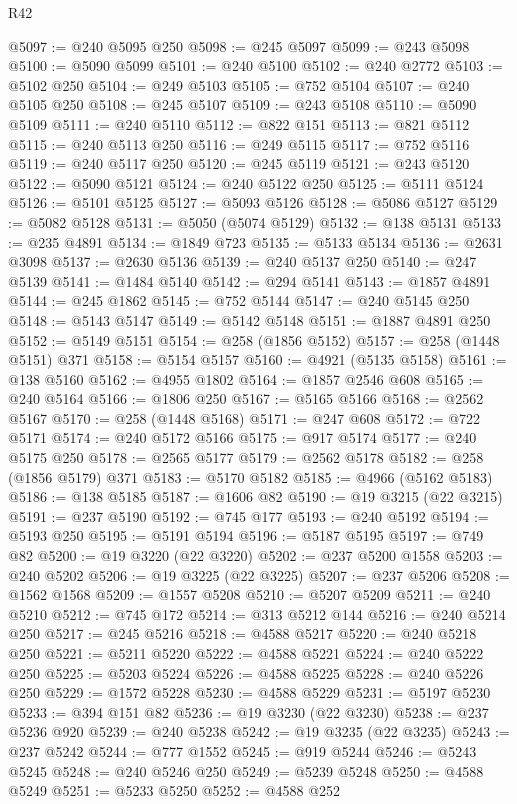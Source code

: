 \begin{lexlean}{R42}
\begin{coremodule}
{@5097 := @240 @5095 @250
@5098 := @245 @5097
@5099 := @243 @5098
@5100 := @5090 @5099
@5101 := @240 @5100
@5102 := @240 @2772
@5103 := @5102 @250
@5104 := @249 @5103
@5105 := @752 @5104
@5107 := @240 @5105 @250
@5108 := @245 @5107
@5109 := @243 @5108
@5110 := @5090 @5109
@5111 := @240 @5110
@5112 := @822 @151
@5113 := @821 @5112
@5115 := @240 @5113 @250
@5116 := @249 @5115
@5117 := @752 @5116
@5119 := @240 @5117 @250
@5120 := @245 @5119
@5121 := @243 @5120
@5122 := @5090 @5121
@5124 := @240 @5122 @250
@5125 := @5111 @5124
@5126 := @5101 @5125
@5127 := @5093 @5126
@5128 := @5086 @5127
@5129 := @5082 @5128
@5131 := @5050 (@5074 @5129)
@5132 := @138 @5131
@5133 := @235 @4891
@5134 := @1849 @723
@5135 := @5133 @5134
@5136 := @2631 @3098
@5137 := @2630 @5136
@5139 := @240 @5137 @250
@5140 := @247 @5139
@5141 := @1484 @5140
@5142 := @294 @5141
@5143 := @1857 @4891
@5144 := @245 @1862
@5145 := @752 @5144
@5147 := @240 @5145 @250
@5148 := @5143 @5147
@5149 := @5142 @5148
@5151 := @1887 @4891 @250
@5152 := @5149 @5151
@5154 := @258 (@1856 @5152)
@5157 := @258 (@1448 @5151) @371
@5158 := @5154 @5157
@5160 := @4921 (@5135 @5158)
@5161 := @138 @5160
@5162 := @4955 @1802
@5164 := @1857 @2546 @608
@5165 := @240 @5164
@5166 := @1806 @250
@5167 := @5165 @5166
@5168 := @2562 @5167
@5170 := @258 (@1448 @5168)
@5171 := @247 @608
@5172 := @722 @5171
@5174 := @240 @5172 @5166
@5175 := @917 @5174
@5177 := @240 @5175 @250
@5178 := @2565 @5177
@5179 := @2562 @5178
@5182 := @258 (@1856 @5179) @371
@5183 := @5170 @5182
@5185 := @4966 (@5162 @5183)
@5186 := @138 @5185
@5187 := @1606 @82
@5190 := @19 @3215 (@22 @3215)
@5191 := @237 @5190
@5192 := @745 @177
@5193 := @240 @5192
@5194 := @5193 @250
@5195 := @5191 @5194
@5196 := @5187 @5195
@5197 := @749 @82
@5200 := @19 @3220 (@22 @3220)
@5202 := @237 @5200 @1558
@5203 := @240 @5202
@5206 := @19 @3225 (@22 @3225)
@5207 := @237 @5206
@5208 := @1562 @1568
@5209 := @1557 @5208
@5210 := @5207 @5209
@5211 := @240 @5210
@5212 := @745 @172
@5214 := @313 @5212 @144
@5216 := @240 @5214 @250
@5217 := @245 @5216
@5218 := @4588 @5217
@5220 := @240 @5218 @250
@5221 := @5211 @5220
@5222 := @4588 @5221
@5224 := @240 @5222 @250
@5225 := @5203 @5224
@5226 := @4588 @5225
@5228 := @240 @5226 @250
@5229 := @1572 @5228
@5230 := @4588 @5229
@5231 := @5197 @5230
@5233 := @394 @151 @82
@5236 := @19 @3230 (@22 @3230)
@5238 := @237 @5236 @920
@5239 := @240 @5238
@5242 := @19 @3235 (@22 @3235)
@5243 := @237 @5242
@5244 := @777 @1552
@5245 := @919 @5244
@5246 := @5243 @5245
@5248 := @240 @5246 @250
@5249 := @5239 @5248
@5250 := @4588 @5249
@5251 := @5233 @5250
@5252 := @4588 @252
}
\end{coremodule}
\end{lexlean}
